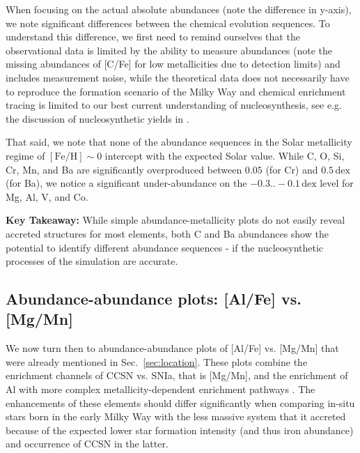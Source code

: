 \documentclass[fleqn,usenatbib]{mnras}
\begin{document}
When focusing on the actual absolute abundances (note the difference in y-axis), we note significant differences between the chemical evolution sequences. To understand this difference, we first need to remind ourselves that the observational data is limited by the ability to measure abundances (note the missing abundances of [C/Fe] for low metallicities due to detection limits) and includes measurement noise, while the theoretical data does not necessarily have to reproduce the formation scenario of the Milky Way and chemical enrichment tracing is limited to our best current understanding of nucleosynthesis, see e.g. the discussion of nucleosynthetic yields in \citet{Buck2021}.

That said, we note that none of the abundance sequences in the Solar metallicity regime of $\mathrm{[Fe/H]} \sim 0$ intercept with the expected Solar value. While C, O, Si, Cr, Mn, and Ba are significantly overproduced between $0.05$ (for Cr) and $0.5\,\mathrm{dex}$ (for Ba), we notice a significant under-abundance on the $-0.3..-0.1\,\mathrm{dex}$ level for Mg, Al, V, and Co.

\textbf{Key Takeaway:} While simple abundance-metallicity plots do not easily reveal accreted structures for most elements, both C and Ba abundances show the potential to identify different abundance sequences - if the nucleosynthetic processes of the simulation are accurate.

\subsection{Abundance-abundance plots: [Al/Fe] vs. [Mg/Mn]} \label{sec:alfe_mgmn}

We now turn then to abundance-abundance plots of [Al/Fe] vs. [Mg/Mn] that were already mentioned in Sec.~\ref{sec:location}. These plots combine the enrichment channels of CCSN vs. SNIa, that is [Mg/Mn], and the enrichment of Al with more complex metallicity-dependent enrichment pathways \citep{Hawkins2015, Das2020, Kobayashi2020}. The enhancements of these elements should differ significantly when comparing in-situ stars born in the early Milky Way with the less massive system that it accreted because of the expected lower star formation intensity (and thus iron abundance) and occurrence of CCSN in the latter. 
\end{document}
